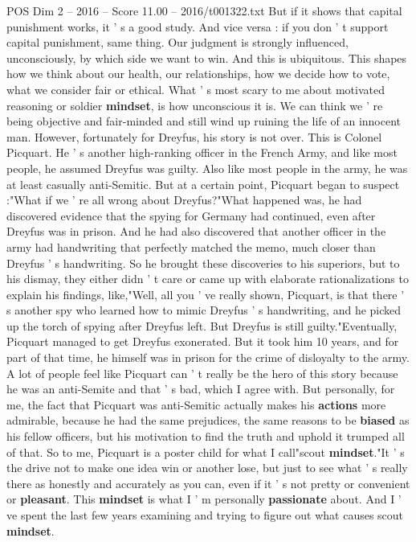 \begin{textsample}{POS Dim 2 – 2016 – Score 11.00 – 2016/t001322.txt}
But if it shows that capital punishment works, it ' s a good study.
And vice versa : if you don ' t support capital punishment, same thing.
Our judgment is strongly influenced, unconsciously, by which side we want to win.
And this is ubiquitous.
This shapes how we think about our health, our relationships, how we decide how to vote, what we consider fair or ethical.
What ' s most scary to me about motivated reasoning or soldier \textbf{mindset}, is how unconscious it is.
We can think we ' re being objective and fair-minded and still wind up ruining the life of an innocent man.
However, fortunately for Dreyfus, his story is not over.
This is Colonel Picquart.
He ' s another high-ranking officer in the French Army, and like most people, he assumed Dreyfus was guilty.
Also like most people in the army, he was at least casually anti-Semitic.
But at a certain point, Picquart began to suspect :"What if we ' re all wrong about Dreyfus?"What happened was, he had discovered evidence that the spying for Germany had continued, even after Dreyfus was in prison.
And he had also discovered that another officer in the army had handwriting that perfectly matched the memo, much closer than Dreyfus ' s handwriting.
So he brought these discoveries to his superiors, but to his dismay, they either didn ' t care or came up with elaborate rationalizations to explain his findings, like,"Well, all you ' ve really shown, Picquart, is that there ' s another spy who learned how to mimic Dreyfus ' s handwriting, and he picked up the torch of spying after Dreyfus left.
But Dreyfus is still guilty."Eventually, Picquart managed to get Dreyfus exonerated.
But it took him 10 years, and for part of that time, he himself was in prison for the crime of disloyalty to the army.
A lot of people feel like Picquart can ' t really be the hero of this story because he was an anti-Semite and that ' s bad, which I agree with.
But personally, for me, the fact that Picquart was anti-Semitic actually makes his \textbf{actions} more admirable, because he had the same prejudices, the same reasons to be \textbf{biased} as his fellow officers, but his motivation to find the truth and uphold it trumped all of that.
So to me, Picquart is a poster child for what I call"scout \textbf{mindset}."It ' s the drive not to make one idea win or another lose, but just to see what ' s really there as honestly and accurately as you can, even if it ' s not pretty or convenient or \textbf{pleasant}.
This \textbf{mindset} is what I ' m personally \textbf{passionate} about.
And I ' ve spent the last few years examining and trying to figure out what causes scout \textbf{mindset}.

\end{textsample}
